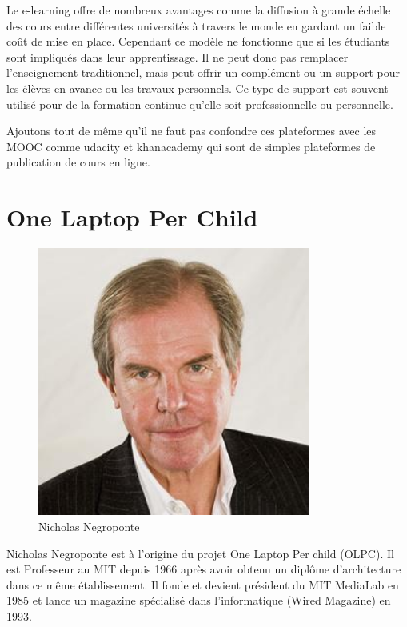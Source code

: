 Le e-learning offre de nombreux avantages comme la diffusion à grande échelle des cours entre différentes universités à travers le monde en gardant un faible coût de mise en place. Cependant ce modèle ne fonctionne que si les étudiants sont impliqués dans leur apprentissage. Il ne peut donc pas remplacer l'enseignement traditionnel, mais peut offrir un complément ou un support pour les élèves en avance ou les travaux personnels. Ce type de support est souvent utilisé pour de la formation continue qu'elle soit professionnelle ou personnelle.

Ajoutons tout de même qu'il ne faut pas confondre ces plateformes avec
les \gls{MOOC} comme udacity et khanacademy qui sont de simples
plateformes de publication de cours en ligne.

\section{One Laptop Per Child}

\begin{minipage}[H]{0.3\linewidth}
  \begin{figure}[H]
  \centering
  \includegraphics[width=0.8\textwidth]{../resources/illustrations/nicholasnegroponte}
  \caption{\mbox{Nicholas} \mbox{Negroponte}}
  \end{figure}
\end{minipage}
\begin{minipage}[H]{0.7\linewidth}
Nicholas Negroponte est à l'origine du projet \og One Laptop Per child \fg{} (\gls{OLPC}). Il est Professeur au MIT depuis 1966 après avoir obtenu un diplôme d'architecture dans ce même établissement. Il fonde et devient président du MIT MediaLab en 1985 et lance un magazine spécialisé dans l'informatique (Wired Magazine) en 1993\cite{wikipedia_nicholas_negroponte}.
\vspace{.8cm}
\end{minipage}

